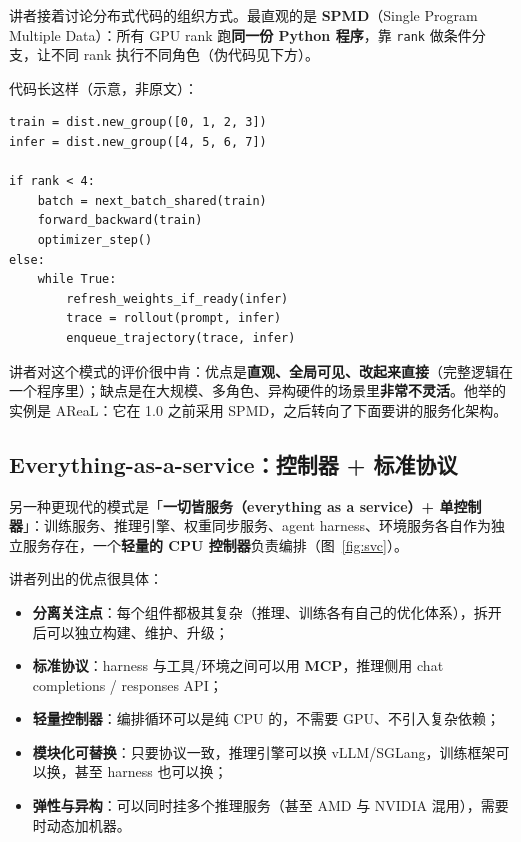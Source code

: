 \documentclass[a4paper]{article}
\begin{document}
讲者接着讨论分布式代码的组织方式。最直观的是 \textbf{SPMD}（Single Program Multiple Data）：所有 GPU rank 跑\textbf{同一份 Python 程序}，靠 \texttt{rank} 做条件分支，让不同 rank 执行不同角色（伪代码见下方）。

代码长这样（示意，非原文）：

\begin{lstlisting}[caption={SPMD 风格的伪代码（据讲者幻灯片整理）：所有 rank 跑同一程序，按 rank 分组执行训练或推理分支。}]
train = dist.new_group([0, 1, 2, 3])
infer = dist.new_group([4, 5, 6, 7])

if rank < 4:
    batch = next_batch_shared(train)
    forward_backward(train)
    optimizer_step()
else:
    while True:
        refresh_weights_if_ready(infer)
        trace = rollout(prompt, infer)
        enqueue_trajectory(trace, infer)
\end{lstlisting}

讲者对这个模式的评价很中肯：优点是\textbf{直观、全局可见、改起来直接}（完整逻辑在一个程序里）；缺点是在大规模、多角色、异构硬件的场景里\textbf{非常不灵活}。他举的实例是 AReaL：它在 1.0 之前采用 SPMD，之后转向了下面要讲的服务化架构。

\subsection{Everything-as-a-service：控制器 + 标准协议}

另一种更现代的模式是「\textbf{一切皆服务（everything as a service）+ 单控制器}」：训练服务、推理引擎、权重同步服务、agent harness、环境服务各自作为独立服务存在，一个\textbf{轻量的 CPU 控制器}负责编排（图~\ref{fig:svc}）。

讲者列出的优点很具体：

\begin{itemize}
\item \textbf{分离关注点}：每个组件都极其复杂（推理、训练各有自己的优化体系），拆开后可以独立构建、维护、升级；
\item \textbf{标准协议}：harness 与工具/环境之间可以用 \textbf{MCP}，推理侧用 chat completions / responses API；
\item \textbf{轻量控制器}：编排循环可以是纯 CPU 的，不需要 GPU、不引入复杂依赖；
\item \textbf{模块化可替换}：只要协议一致，推理引擎可以换 vLLM/SGLang，训练框架可以换，甚至 harness 也可以换；
\item \textbf{弹性与异构}：可以同时挂多个推理服务（甚至 AMD 与 NVIDIA 混用），需要时动态加机器。
\end{itemize}
\end{document}
